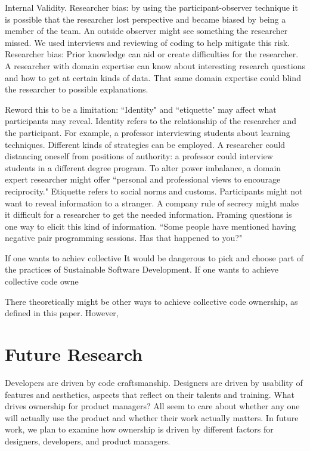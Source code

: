 Internal Validity. Researcher bias: by using the participant-observer technique it is possible that the researcher lost perspective and became biased by being a member of the team. An outside observer might see something the researcher missed. We used interviews and reviewing of coding to help mitigate this risk.
Researcher bias: Prior knowledge can aid or create difficulties for the researcher. A researcher with domain expertise can know about interesting research questions and how to get at certain kinds of data. That same domain expertise could blind the researcher to possible explanations.


Reword this to be a limitation: ``Identity" and ``etiquette" may affect what participants may reveal. Identity refers to the relationship of the researcher and the participant. For example, a professor interviewing students about learning techniques. Different kinds of strategies can be employed. A researcher could distancing oneself from positions of authority: a professor could interview students in a different degree program. To alter power imbalance, a domain expert researcher might offer ``personal and professional views to encourage reciprocity." Etiquette refers to social norms and customs. Participants might not want to reveal information to a stranger. A company rule of secrecy might make it difficult for a researcher to get the needed information. Framing questions is one way to elicit this kind of information. ``Some people have mentioned having negative pair programming sessions. Has that happened to you?" 


If one wants to achiev collective It would be dangerous to pick and choose part of the practices of Sustainable Software Development. If one wants to achieve collective code owne

There theoretically might be other ways to achieve collective code ownership, as defined in this paper. However, 

\section{Future Research}
Developers are driven by code craftsmanship. Designers are driven by usability of features and aesthetics, aspects that reflect on their talents and training. What drives ownership for product managers? All seem to care about whether any one will actually use the product and whether their work actually matters. In future work,  we plan to examine how ownership is driven by different factors for designers, developers, and product managers.

